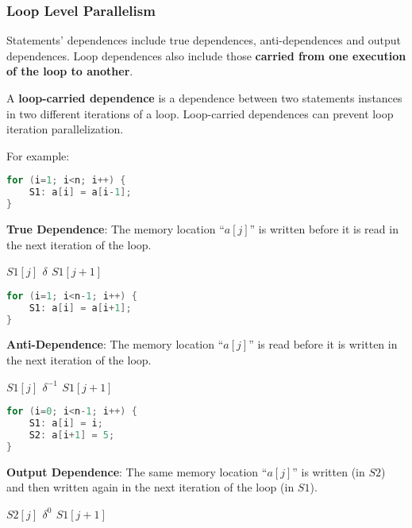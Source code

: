\subsubsection{Loop Level Parallelism}
\par Statements’ dependences include true dependences, anti-dependences and output dependences. Loop dependences also include those \textbf{carried from one execution of the loop to another}.
\par A \textbf{loop-carried dependence} is a dependence between two statements instances in two different iterations of a loop. Loop-carried dependences can prevent loop iteration parallelization.
\par For example:
\begin{center}
    \begin{tcolorbox}[colback=nightblue!5!white, colframe=nightblue!75!black]
    \centering
            \begin{lstlisting}[label={lst:truecode}, language=Java, morekeywords={S1}]
for (i=1; i<n; i++) {
    S1: a[i] = a[i-1];
}\end{lstlisting}
    \end{tcolorbox}
    \par \textbf{True Dependence}: The memory location \enquote{$a[j]$} is written before it is read in the next iteration of the loop.
    \par \textbf{$S1[j]$ $\delta$ $S1[j+1]$}
%
\clearpage
%
\begin{tcolorbox}[colback=nightblue!5!white, colframe=nightblue!75!black]
    \centering
            \begin{lstlisting}[label={lst:anticode}, language=Java, morekeywords={S1}]
for (i=1; i<n-1; i++) {
    S1: a[i] = a[i+1];
}\end{lstlisting}
    \end{tcolorbox}
    \par \textbf{Anti-Dependence}: The memory location \enquote{$a[j]$} is read before it is written in the next iteration of the loop.
    \par \textbf{$S1[j]$ $\delta^{-1}$ $S1[j+1]$}
\begin{tcolorbox}[colback=nightblue!5!white, colframe=nightblue!75!black]
    \centering
            \begin{lstlisting}[label={lst:outcode}, language=Java, morekeywords={S1,S2}]
for (i=0; i<n-1; i++) {
    S1: a[i] = i;
    S2: a[i+1] = 5;
}\end{lstlisting}
    \end{tcolorbox}
    \par \textbf{Output Dependence}: The same memory location \enquote{$a[j]$} is written (in $S2$) and then written again in the next iteration of the loop (in $S1$).
    \par \textbf{$S2[j]$ $\delta^0$ $S1[j+1]$}
\end{center}

